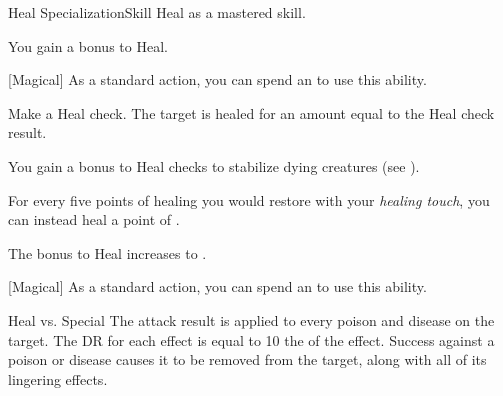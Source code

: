     \begin{feat}{Heal Specialization}{Skill}
        \featpre Heal as a mastered skill.
        \featben

         You gain a  bonus to Heal.

        [Magical] As a standard action, you can spend an  to use this ability.
        \begin{ability}
            \begin{spelltargetinginfo}
            \end{spelltargetinginfo}
            \begin{spelleffects}
                \spelleffect Make a Heal check. The target is healed for an amount equal to the Heal check result.
            \end{spelleffects}
        \end{ability}

         You gain a  bonus to Heal checks to stabilize dying creatures (see ).

         For every five points of healing you would restore with your \textit{healing touch}, you can instead heal a point of .

         The bonus to Heal increases to .

        [Magical] As a standard action, you can spend an  to use this ability.
        \begin{ability}
            \begin{spelltargetinginfo}
            \end{spelltargetinginfo}
            \begin{spelleffects}
                \begin{spellattack}{Heal vs. Special}
                    \spellspecial The attack result is applied to every poison and disease on the target.
                    The DR for each effect is equal to 10 \add the  of the effect.
                    \spellsuccess Success against a poison or disease causes it to be removed from the target, along with all of its lingering effects.
                \end{spellattack}
            \end{spelleffects}
        \end{ability}


\end{feat}
